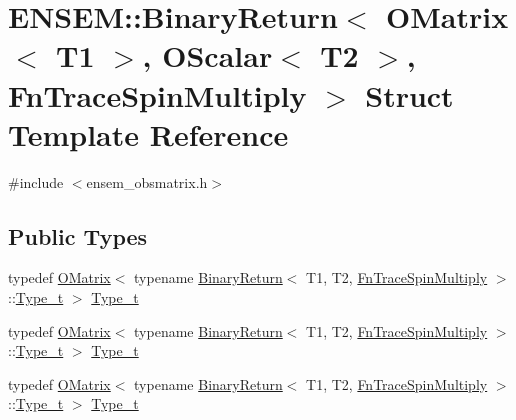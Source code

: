 \hypertarget{structENSEM_1_1BinaryReturn_3_01OMatrix_3_01T1_01_4_00_01OScalar_3_01T2_01_4_00_01FnTraceSpinMultiply_01_4}{}\section{E\+N\+S\+EM\+:\+:Binary\+Return$<$ O\+Matrix$<$ T1 $>$, O\+Scalar$<$ T2 $>$, Fn\+Trace\+Spin\+Multiply $>$ Struct Template Reference}
\label{structENSEM_1_1BinaryReturn_3_01OMatrix_3_01T1_01_4_00_01OScalar_3_01T2_01_4_00_01FnTraceSpinMultiply_01_4}


{\ttfamily \#include $<$ensem\+\_\+obsmatrix.\+h$>$}

\subsection*{Public Types}
\begin{DoxyCompactItemize}
\item 
typedef \mbox{\hyperlink{classENSEM_1_1OMatrix}{O\+Matrix}}$<$ typename \mbox{\hyperlink{structENSEM_1_1BinaryReturn}{Binary\+Return}}$<$ T1, T2, \mbox{\hyperlink{structENSEM_1_1FnTraceSpinMultiply}{Fn\+Trace\+Spin\+Multiply}} $>$\+::\mbox{\hyperlink{structENSEM_1_1BinaryReturn_3_01OMatrix_3_01T1_01_4_00_01OScalar_3_01T2_01_4_00_01FnTraceSpinMultiply_01_4_a7365e18c420935c8845b95d78d843106}{Type\+\_\+t}} $>$ \mbox{\hyperlink{structENSEM_1_1BinaryReturn_3_01OMatrix_3_01T1_01_4_00_01OScalar_3_01T2_01_4_00_01FnTraceSpinMultiply_01_4_a7365e18c420935c8845b95d78d843106}{Type\+\_\+t}}
\item 
typedef \mbox{\hyperlink{classENSEM_1_1OMatrix}{O\+Matrix}}$<$ typename \mbox{\hyperlink{structENSEM_1_1BinaryReturn}{Binary\+Return}}$<$ T1, T2, \mbox{\hyperlink{structENSEM_1_1FnTraceSpinMultiply}{Fn\+Trace\+Spin\+Multiply}} $>$\+::\mbox{\hyperlink{structENSEM_1_1BinaryReturn_3_01OMatrix_3_01T1_01_4_00_01OScalar_3_01T2_01_4_00_01FnTraceSpinMultiply_01_4_a7365e18c420935c8845b95d78d843106}{Type\+\_\+t}} $>$ \mbox{\hyperlink{structENSEM_1_1BinaryReturn_3_01OMatrix_3_01T1_01_4_00_01OScalar_3_01T2_01_4_00_01FnTraceSpinMultiply_01_4_a7365e18c420935c8845b95d78d843106}{Type\+\_\+t}}
\item 
typedef \mbox{\hyperlink{classENSEM_1_1OMatrix}{O\+Matrix}}$<$ typename \mbox{\hyperlink{structENSEM_1_1BinaryReturn}{Binary\+Return}}$<$ T1, T2, \mbox{\hyperlink{structENSEM_1_1FnTraceSpinMultiply}{Fn\+Trace\+Spin\+Multiply}} $>$\+::\mbox{\hyperlink{structENSEM_1_1BinaryReturn_3_01OMatrix_3_01T1_01_4_00_01OScalar_3_01T2_01_4_00_01FnTraceSpinMultiply_01_4_a7365e18c420935c8845b95d78d843106}{Type\+\_\+t}} $>$ \mbox{\hyperlink{structENSEM_1_1BinaryReturn_3_01OMatrix_3_01T1_01_4_00_01OScalar_3_01T2_01_4_00_01FnTraceSpinMultiply_01_4_a7365e18c420935c8845b95d78d843106}{Type\+\_\+t}}
\end{DoxyCompactItemize}



